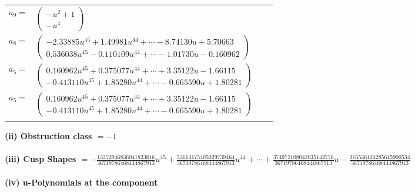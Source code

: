 \documentclass[1p]{elsarticle_modified}
\theoremstyle{definition}
\begin{document}
\begin{tabular}{m{7pt} m{180pt} m{7pt} m{180pt} }
\flushright $a_{9}=$&$\begin{pmatrix}- u^2+1\\- u^4\end{pmatrix}$ \\
\flushright $a_{8}=$&$\begin{pmatrix}-2.33885 u^{45}+1.49981 u^{44}+\cdots-8.74130 u+5.70663\\0.536038 u^{45}-0.110109 u^{44}+\cdots-1.01730 u-0.160962\end{pmatrix}$ \\
\flushright $a_{5}=$&$\begin{pmatrix}0.160962 u^{45}+0.375077 u^{44}+\cdots+3.35122 u-1.66115\\-0.413110 u^{45}+1.85280 u^{44}+\cdots-0.665590 u+1.80281\end{pmatrix}$\\ \flushright $a_{5}=$&$\begin{pmatrix}0.160962 u^{45}+0.375077 u^{44}+\cdots+3.35122 u-1.66115\\-0.413110 u^{45}+1.85280 u^{44}+\cdots-0.665590 u+1.80281\end{pmatrix}$\\&\end{tabular}
\flushleft \textbf{(ii) Obstruction class $= -1$}\\~\\
\flushleft \textbf{(iii) Cusp Shapes $= -\frac{13372946836041823816}{36719786468444867913} u^{45}+\frac{53663175405029739464}{36719786468444867913} u^{44}+\cdots+\frac{374972108042035142776}{36719786468444867913} u-\frac{316536124285645900534}{36719786468444867913}$}\\~\\
\newpage\renewcommand{\arraystretch}{1}
\flushleft \textbf{(iv) u-Polynomials at the component}\newline \\
\end{document}
